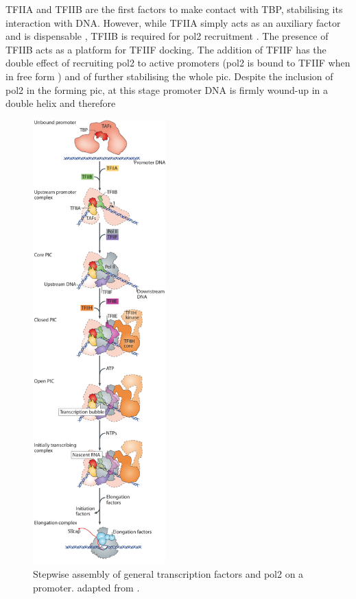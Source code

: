 TFIIA and TFIIB are the first factors to make contact with TBP, stabilising its interaction with DNA.
However, while TFIIA simply acts as an auxiliary factor and is dispensable \citep{imbalzano:1994:transcription}, TFIIB is required for \gls{pol2} recruitment \citep{bushnell:2004:structural}.
The presence of TFIIB  acts as a platform for TFIIF docking. 
The addition of TFIIF has the double effect of recruiting \gls{pol2} to active promoters (\gls{pol2} is bound to TFIIF when in free form \citep{rani:2004:rna}) and of further stabilising the whole \gls{pic}. 
Despite the inclusion of \gls{pol2} in the forming \gls{pic}, at this stage promoter DNA is firmly wound-up in a double helix and therefore 
\begin{figure}
\centering
\includegraphics[width=5.095cm]{figures/introduction/picAssembly} %
\caption[Stepwise PIC assembly]{
Stepwise assembly of general transcription factors and \gls{pol2} on a promoter.
adapted from \cite{sainsbury:2015:structural}.
}
\label{fig:picAssembly}
\centering
\end{figure}
